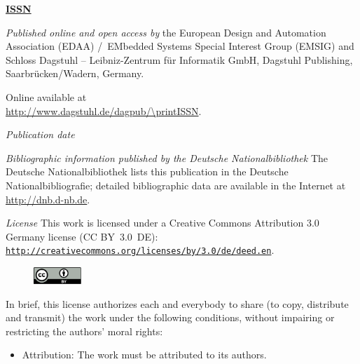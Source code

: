 \documentclass[a4paper,UKenglish]{litesmaster}
\begin{document}
\frontmatter

\maketitle

\begin{publicationinfo}%
\sffamily
\twocolumn

{\Large\bf\sffamily \textbf{\href{http://www.dagstuhl.de/lites}{ISSN \printISSN{}}}}

\bigskip

\emph{Published online and open access by}\newline
the European Design and Automation Association (EDAA) /\ EMbedded Systems Special Interest Group (EMSIG) and
Schloss Dagstuhl -- Leibniz-Zentrum f\"ur Informatik GmbH, Dagstuhl Publishing, Saarbr\"ucken/Wadern, Germany. 

Online available at \\ \url{http://www.dagstuhl.de/dagpub/\printISSN}.

\bigskip
\emph{Publication date}\newline
\printDatePublished{}



\bigskip

\emph{Bibliographic information published by the Deutsche Nationalbibliothek}\newline
The Deutsche Nationalbibliothek lists this publication in the Deutsche Nationalbibliografie; detailed bibliographic data are available in the Internet at \href{http://dnb.d-nb.de}{http://dnb.d-nb.de}. 

\bigskip

\emph{License}\newline
This work is licensed under a Creative Commons Attribution 3.0 Germany license (CC BY~3.0~DE): \href{http://creativecommons.org/licenses/by/3.0/de/deed.en}{\nolinkurl{http://creativecommons.org/licenses/by/}}\linebreak \href{http://creativecommons.org/licenses/by/3.0/de/deed.en}{\nolinkurl{3.0/de/deed.en}}.
\begin{figure}
\vspace*{-1\baselineskip}
\includegraphics[width=1.8cm]{cc-by}
\end{figure} 
In brief, this license authorizes each and everybody to share (to
copy, distribute and transmit) the work under the following
conditions, without impairing or restricting the authors'
moral rights:
\begin{itemize}
\item Attribution: The work must be attributed to its authors.
\end{itemize}


\end{publicationinfo}
\end{document}

